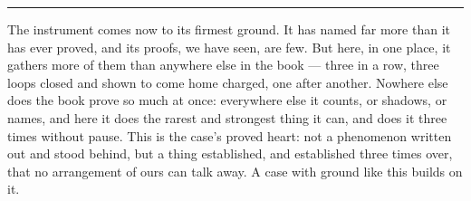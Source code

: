 %
%
%
%

\bigskip
\begin{center}
\rule{0.4\textwidth}{0.4pt}
\end{center}
\bigskip

\noindent The instrument comes now to its firmest ground. It has named far more than it has ever proved, and its
proofs, we have seen, are few. But here, in one place, it gathers more of them than anywhere else in the book
--- three in a row, three loops closed and shown to come home charged, one after another. Nowhere else does the book
prove so much at once: everywhere else it counts, or shadows, or names, and here it does the rarest and
strongest thing it can, and does it three times without pause. This is the case's proved heart: not a phenomenon written out and stood behind, but a thing established, and established three times
over, that no arrangement of ours can talk away. A case with ground like this builds on it.

